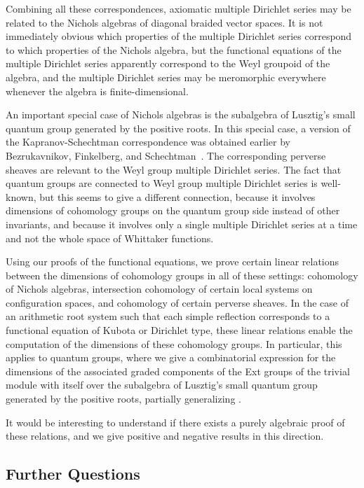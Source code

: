 \documentclass[11pt,letterpaper]{article}
\theoremstyle{definition}
\theoremstyle{remark}
\numberwithin{equation}{section}
\theoremstyle{dotless}
\begin{document}
Combining all these correspondences, axiomatic multiple Dirichlet series may be related to the Nichols algebras of diagonal braided vector spaces. It is not immediately obvious which properties of the multiple Dirichlet series correspond to which properties of the Nichols algebra, but the functional equations of the multiple Dirichlet series apparently correspond to the Weyl groupoid of the algebra, and the multiple Dirichlet series may be meromorphic everywhere whenever the algebra is finite-dimensional.

An important special case of Nichols algebras is the subalgebra of Lusztig's small quantum group generated by the positive roots. In this special case, a version of the Kapranov-Schechtman correspondence was obtained earlier by Bezrukavnikov, Finkelberg, and Schechtman~\cite{Bezrukavnikov1998}. The corresponding perverse sheaves are relevant to the Weyl group multiple Dirichlet series. The fact that quantum groups are connected to Weyl group multiple Dirichlet series is well-known, but this seems to give a different connection, because it involves dimensions of cohomology groups on the quantum group side instead of other invariants, and because it involves only a single multiple Dirichlet series at a time and not the whole space of Whittaker functions.

Using our proofs of the functional equations, we prove certain linear relations between the dimensions of cohomology groups in all of these settings: cohomology of Nichols algebras, intersection  cohomology of certain local systems on configuration spaces, and cohomology of certain perverse sheaves. In the case of an arithmetic root system such that each simple reflection corresponds to a functional equation of Kubota or Dirichlet type, these linear relations enable the computation of the dimensions of these cohomology groups. In particular, this applies to quantum groups, where we give a combinatorial expression for the dimensions of the associated graded components of the Ext groups of the trivial module with itself over the subalgebra of Lusztig's small quantum group generated by the positive roots, partially generalizing \cite[Theorem 5.6.1]{Drupieski2012}. 

It would be interesting to understand if there exists a purely algebraic proof of these relations, and we give positive and negative results in this direction.

\subsection{Further Questions}
\end{document}
